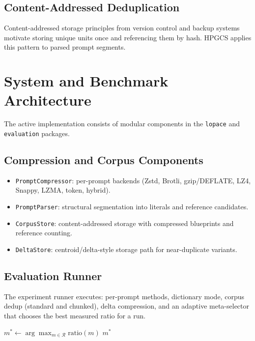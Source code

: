 \documentclass[10pt,conference]{IEEEtran}
\begin{document}
\subsection{Content-Addressed Deduplication}
Content-addressed storage principles from version control and backup systems \cite{git2005, dedup_storage2010, datadomain2007} motivate storing unique units once and referencing them by hash. HPGCS applies this pattern to parsed prompt segments.

\section{System and Benchmark Architecture}
The active implementation consists of modular components in the \texttt{lopace} and \texttt{evaluation} packages.

\subsection{Compression and Corpus Components}
\begin{itemize}
    \item \texttt{PromptCompressor}: per-prompt backends (Zstd, Brotli, gzip/DEFLATE, LZ4, Snappy, LZMA, token, hybrid).
    \item \texttt{PromptParser}: structural segmentation into literals and reference candidates.
    \item \texttt{CorpusStore}: content-addressed storage with compressed blueprints and reference counting.
    \item \texttt{DeltaStore}: centroid/delta-style storage path for near-duplicate variants.
\end{itemize}

\subsection{Evaluation Runner}
The experiment runner executes: per-prompt methods, dictionary mode, corpus dedup (standard and chunked), delta compression, and an adaptive meta-selector that chooses the best measured ratio for a run.

\begin{algorithm}
\caption{Adaptive Best-of-Measured Selector}
\label{alg:adaptive}
\begin{algorithmic}[1]
\State $m^* \gets \arg\max_{m \in \mathcal{R}} \text{ratio}(m)$
\State \Return $m^*$
\end{algorithmic}
\end{algorithm}
\end{document}
